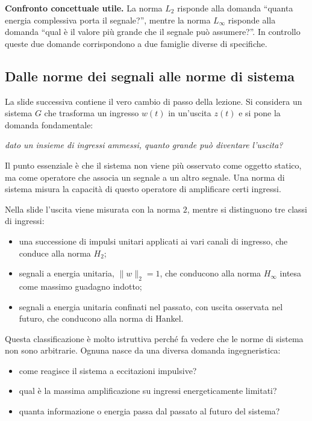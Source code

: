 \documentclass[11pt,a4paper]{article}
\begin{document}
\begin{focusbox}
\textbf{Confronto concettuale utile.} La norma $L_2$ risponde alla domanda ``quanta energia complessiva porta il segnale?'', mentre la norma $L_\infty$ risponde alla domanda ``qual \`e il valore pi\`u grande che il segnale pu\`o assumere?''. In controllo queste due domande corrispondono a due famiglie diverse di specifiche.
\end{focusbox}

\subsection{Dalle norme dei segnali alle norme di sistema}

La slide successiva contiene il vero cambio di passo della lezione. Si considera un sistema $G$ che trasforma un ingresso $w(t)$ in un'uscita $z(t)$ e si pone la domanda fondamentale:
\begin{center}
\emph{dato un insieme di ingressi ammessi, quanto grande pu\`o diventare l'uscita?}
\end{center}
Il punto essenziale \`e che il sistema non viene pi\`u osservato come oggetto statico, ma come operatore che associa un segnale a un altro segnale. Una norma di sistema misura la capacit\`a di questo operatore di amplificare certi ingressi.

Nella slide l'uscita viene misurata con la norma $2$, mentre si distinguono tre classi di ingressi:
\begin{itemize}
    \item una successione di impulsi unitari applicati ai vari canali di ingresso, che conduce alla norma $H_2$;
    \item segnali a energia unitaria, $\|w\|_2=1$, che conducono alla norma $H_\infty$ intesa come massimo guadagno indotto;
    \item segnali a energia unitaria confinati nel passato, con uscita osservata nel futuro, che conducono alla norma di Hankel.
\end{itemize}

Questa classificazione \`e molto istruttiva perch\'e fa vedere che le norme di sistema non sono arbitrarie. Ognuna nasce da una diversa domanda ingegneristica:
\begin{itemize}
    \item come reagisce il sistema a eccitazioni impulsive?
    \item qual \`e la massima amplificazione su ingressi energeticamente limitati?
    \item quanta informazione o energia passa dal passato al futuro del sistema?
\end{itemize}
\end{document}
